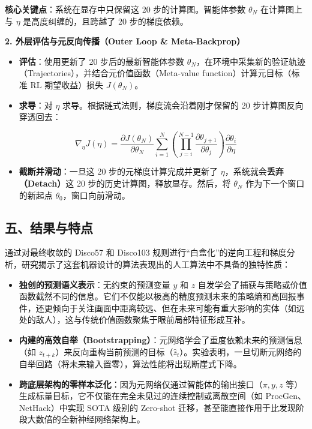 \textbf{核心关键点}：系统在显存中只保留这 20 步的计算图。智能体参数 \(\theta_N\) 在计算图上与 \(\eta\) 是高度纠缠的，且跨越了 20 步的梯度依赖。

\textbf{2. 外层评估与元反向传播（Outer Loop \& Meta-Backprop）}

\begin{itemize}
\tightlist
\item
  \textbf{评估}：使用更新了 20 步后的最新智能体参数 \(\theta_N\)，在环境中采集新的验证轨迹（Trajectories），并结合元价值函数（Meta-value function）计算元目标（标准 RL 期望收益）损失 \(J(\theta_N)\)。
\item
  \textbf{求导}：对 \(\eta\) 求导。根据链式法则，梯度流会沿着刚才保留的 20 步计算图反向穿透回去：
\end{itemize}

\[
\nabla_\eta J(\eta)
= \frac{\partial J(\theta_N)}{\partial \theta_N}
\sum_{i=1}^{N}
\left(\prod_{j=i}^{N-1} \frac{\partial \theta_{j+1}}{\partial \theta_j}\right)
\frac{\partial \theta_i}{\partial \eta}
\]

\begin{itemize}
\tightlist
\item
  \textbf{截断并滑动}：一旦这 20 步的元梯度计算完成并更新了 \(\eta\)，系统就会\textbf{丢弃（Detach）}这 20 步的历史计算图，释放显存。然后，将 \(\theta_N\) 作为下一个窗口的新起点 \(\theta_0\)，窗口向前滑动。
\end{itemize}

\hypertarget{ux4e94ux7ed3ux679cux4e0eux7279ux70b9}{%
\subsection{五、结果与特点}\label{ux4e94ux7ed3ux679cux4e0eux7279ux70b9}}

通过对最终收敛的 Disco57 和 Disco103 规则进行``白盒化''的逆向工程和梯度分析，研究揭示了这套机器设计的算法表现出的人工算法中不具备的独特性质：

\begin{itemize}
\tightlist
\item
  \textbf{独创的预测语义表示}：无约束的预测变量 \(y\) 和 \(z\) 自发学会了捕获与策略或价值函数截然不同的信息。它们不仅能以极高的精度预测未来的策略熵和高回报事件，还更倾向于关注画面中距离较远、但在未来可能有重大影响的实体（如远处的敌人），这与传统价值函数聚焦于眼前局部特征形成互补。
\item
  \textbf{内建的高效自举（Bootstrapping）}：元网络学会了重度依赖未来的预测信息（如 \(z_{t+k}\)）来反向重构当前预测的目标（\(\hat{z}_t\)）。实验表明，一旦切断元网络的自举回路（将未来输入置零），算法性能将出现断崖式下降。
\item
  \textbf{跨底层架构的零样本泛化}：因为元网络仅通过智能体的输出接口（\(\pi, y, z\) 等）生成标量目标，它不仅能在完全未见过的连续控制或离散空间（如 ProcGen、NetHack）中实现 SOTA 级别的 Zero-shot 迁移，甚至能直接作用于比发现阶段大数倍的全新神经网络架构上。
\end{itemize}

